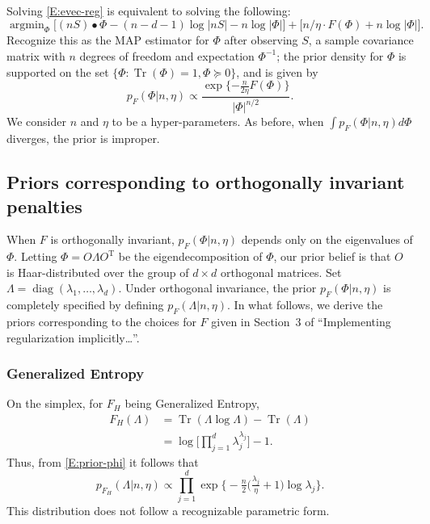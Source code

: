 \documentclass[12pt]{article}
\newcommand{\trans}{\mathrm{T}}
\DeclareMathOperator*{\Tr}{Tr}
\DeclareMathOperator*{\diag}{diag}
\DeclareMathOperator*{\argmin}{argmin}
\theoremstyle{plain}
\begin{document}
Solving \eqref{E:evec-reg} is equivalent to solving the following:
\begin{equation*}
    \argmin_{\Phi}
        \big[
            (n S) \bullet \Phi
            -
            (n-d-1) \log |n S|
            -
            n \log |\Phi|
        \big]
        +
        \big[
            n/\eta \cdot F(\Phi)
            +
            n \log |\Phi|
        \big].
\end{equation*}
Recognize this as the MAP estimator for $\Phi$ after observing $S$, a 
sample covariance matrix with $n$ degrees of freedom and expectation
$\Phi^{-1}$; the prior density for $\Phi$ is supported on the
set $\{ \Phi : \Tr(\Phi) = 1, \Phi \succeq 0\}$, and is given by
\begin{equation}\label{E:prior-phi}
    p_{F}(\Phi | n, \eta)
        \propto
        \frac{
            \exp\{-\tfrac{n}{2\eta} F(\Phi) \}
        }{
            |\Phi|^{n/2}
        }.
\end{equation}
We consider $n$ and $\eta$ to be a hyper-parameters.  As before, when
$\int p_{F}(\Phi | n, \eta) d\Phi$ diverges, the prior is improper.


\subsection{Priors corresponding to orthogonally invariant penalties}

When $F$ is orthogonally invariant, $p_F(\Phi | n, \eta)$ depends only on the
eigenvalues of $\Phi$.  Letting $\Phi = O \Lambda O^\trans$ be the
eigendecomposition of $\Phi$, our prior belief is that $O$ is Haar-distributed over
the group of $d\times d$ orthogonal matrices.  Set
$\Lambda = \diag(\lambda_1, \ldots, \lambda_d)$.  Under orthogonal invariance,
the prior $p_F(\Phi | n, \eta)$ is completely specified by defining
$p_F(\Lambda | n, \eta)$.  In what follows, we derive the priors corresponding
to the choices for $F$ given in Section~3 of ``Implementing regularization
implicitly\ldots''.

\subsubsection*{Generalized Entropy}

On the simplex, for $F_H$ being Generalized Entropy,
\begin{align*}
    F_H(\Lambda)
        &= \Tr(\Lambda \log \Lambda) - \Tr(\Lambda) \\
        &= \log \Big[ \prod_{j=1}^d \lambda_j^{\lambda_j} \Big] - 1.
\end{align*}
Thus, from \eqref{E:prior-phi} it follows that
\[
    p_{F_H}(\Lambda | n, \eta)
        \propto
            \prod_{j=1}^d
                \exp\Big\{
                    -\tfrac{n}{2}
                    \big(
                        \tfrac{\lambda_j}{\eta}
                        +
                        1
                    \big)
                    \log \lambda_j
                \Big\}.
\]
This distribution does not follow a recognizable parametric form.
\end{document}
